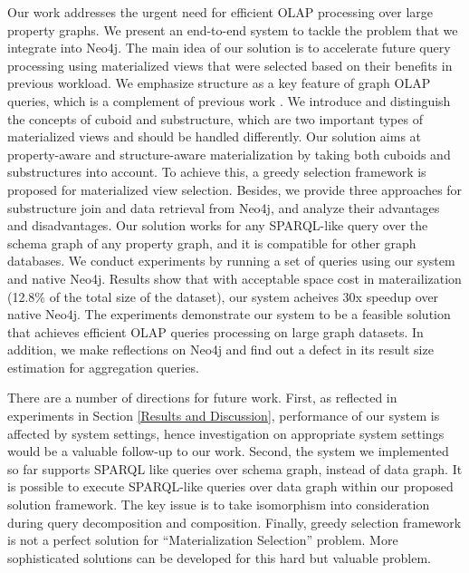 Our work addresses the urgent need for efficient OLAP processing over large property graphs.  We present an end-to-end system to tackle the problem that we integrate into Neo4j. The main idea of our solution is to accelerate future query processing using materialized views that were selected based on their benefits in previous workload. We emphasize structure as a key feature of graph OLAP queries, which is a complement of previous work \cite{sigmod11_ZhaoLXH11}. We introduce and distinguish the concepts of cuboid and substructure, which are two important types of materialized views and should be handled differently. Our solution aims at property-aware and structure-aware materialization by taking both cuboids and substructures into account. To achieve this, a greedy selection framework is proposed for materialized view selection. Besides, we provide three approaches for substructure join and data retrieval from Neo4j, and analyze their advantages and disadvantages. Our solution works for any SPARQL-like query over the schema graph of any property graph, and it is compatible for other graph databases. We conduct experiments by running a set of queries using our system and native Neo4j. Results show that with acceptable space cost in materailization (12.8\% of the total size of the dataset), our system acheives 30x speedup over native Neo4j. The experiments demonstrate our system to be a feasible solution that achieves efficient OLAP queries processing on large graph datasets. In addition, we make reflections on Neo4j and find out a defect in its result size estimation for aggregation queries.    

There are a number of directions for future work. First, as reflected in experiments in Section \ref{Results and Discussion}, performance of our system is affected by system settings, hence investigation on appropriate system settings would be a valuable follow-up to our work. Second, the system we implemented so far supports SPARQL like queries over schema graph, instead of data graph. It is possible to execute SPARQL-like queries over data graph within our proposed solution framework. The key issue is to take isomorphism into consideration during query decomposition and composition. Finally, greedy selection framework is not a perfect solution for ``Materialization Selection'' problem. More sophisticated solutions can be developed for this hard but valuable problem.


